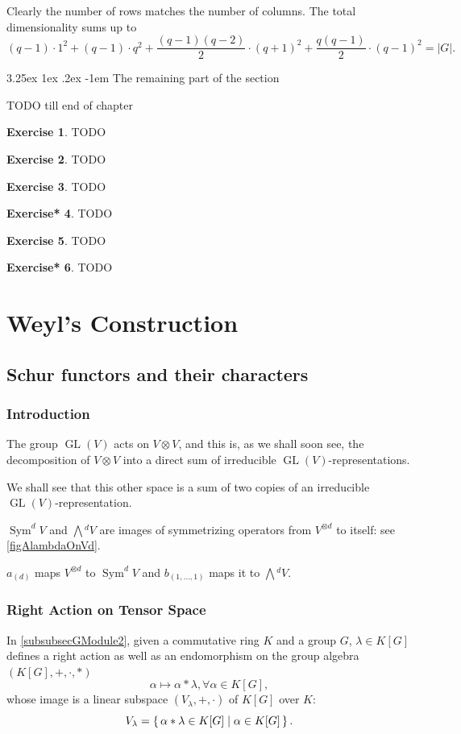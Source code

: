 \documentclass[12pt, letterpaper]{article}
\makeatletter
\newcommand{\GL}{\operatorname{GL}}
\newcommand{\Sym}{\operatorname{Sym}}
\newcommand{\ext}[1]{\bigwedge\!^{#1}}
\newcommand{\red}[1]{{\color{red} #1}}
\newcommand{\card}[1]{\left\lvert #1 \right\rvert}
\renewcommand\paragraph{\@startsection{paragraph}{4}{\z@}%
	{3.25ex \@plus1ex \@minus.2ex}%
	{-1em}%
	{\normalfont\normalsize\bfseries}}
\theoremstyle{definition}
\theoremstyle{remark}
\theoremstyle{definition}
\newtheorem{exe}{Exercise}[section]
\newtheorem{exe*}[exe]{Exercise*}
\theoremstyle{plain}
\numberwithin{equation}{section}
\makeatother
\begin{document}
	Clearly the number of rows matches the number of columns.
	The total dimensionality sums up to
	\[(q-1) \cdot 1^2+(q-1)\cdot q^2+ \frac{(q-1)(q-2)}{2}\cdot (q+1)^2+\frac{q(q-1)}{2}\cdot(q-1)^2=\card{G}. \]
	
	\paragraph{The remaining part of the section}
	
	\red{TODO till end of chapter}
	\begin{exe}
		\red{TODO}
	\end{exe}
	\begin{exe}
		\red{TODO}
	\end{exe}
	\begin{exe}
	\red{TODO}
	\end{exe}
	\begin{exe*}
	\red{TODO}
	\end{exe*}
	\begin{exe}
	\red{TODO}
	\end{exe}
	\begin{exe*}
	\red{TODO}
	\end{exe*}
	\section{Weyl's Construction}
	\subsection{Schur functors and their characters}
	
	\subsubsection{Introduction}
	\red{The group $\GL(V)$ acts on $V \otimes V$, and this is,
		as we shall soon see, the decomposition of $V \otimes V$ into a direct sum of irreducible $\GL(V)$-representations.}
	
	\red{We shall see that this other space is a sum of two copies of an irreducible
	$\GL(V)$-representation.}

	$\Sym^dV$ and $\ext{d}V$ are images of symmetrizing 
	operators from $V^{\otimes d}$ to itself:
	see \ref{figAlambdaOnVd}.
	
	$a_{(d)}$ maps $V^{\otimes d}$ to $\Sym^dV$ and
	$b_{(1,\dots,1)}$ maps it to $\ext{d}V$.

	\subsubsection{Right Action on Tensor Space}
	In \ref{subsubsecGModule2}, given a commutative ring $K$ and a group $G$,
	$\lambda\in K[G]$ defines a right action as well as an endomorphism on the group algebra $(K[G],+,\cdot,*)$
	\[ \alpha \mapsto \alpha* \lambda,\forall \alpha\in K[G], \]
	whose image is a linear subspace $(V_\lambda,+,\cdot)$ of $K[G]$ over $K$:
	\[V_\lambda=\set{\alpha*\lambda\in K[G]|\alpha \in K[G] }. \]
	
\end{document}
